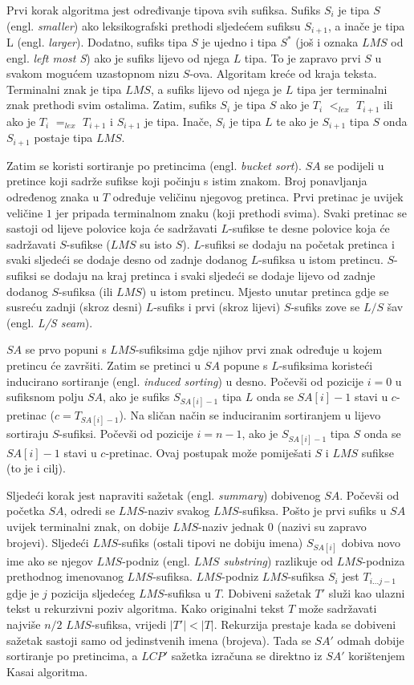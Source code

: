 \documentclass[times, utf8, proizvoljni, numeric]{fer}
\begin{document}
Prvi korak algoritma jest određivanje tipova svih sufiksa. Sufiks $S_{i}$ je tipa $S$ (engl. \textit{smaller}) ako leksikografski prethodi sljedećem sufiksu $S_{i+1}$, a inače je tipa L (engl. \textit{larger}). Dodatno, sufiks tipa $S$ je ujedno i tipa $S^*$ (još i oznaka $LMS$ od engl. \textit{left most S}) ako je sufiks lijevo od njega $L$ tipa. To je zapravo prvi $S$ u svakom mogućem uzastopnom nizu $S$-ova. Algoritam kreće od kraja teksta. Terminalni znak je tipa $LMS$, a sufiks lijevo od njega je $L$ tipa jer terminalni znak prethodi svim ostalima. Zatim, sufiks $S_{i}$ je tipa $S$ ako je $T_{i}$ $<_{lex}$ $T_{i+1}$ ili ako je $T_{i}$ $=_{lex}$ $T_{i+1}$ i $S_{i+1}$ je tipa. Inače, $S_{i}$ je tipa $L$ te ako je $S_{i+1}$ tipa $S$ onda $S_{i+1}$ postaje tipa $LMS$.

Zatim se koristi sortiranje po pretincima (engl. \textit{bucket sort}). $SA$ se podijeli u pretince koji sadrže sufikse koji počinju s istim znakom. Broj ponavljanja određenog znaka u $T$ određuje veličinu njegovog pretinca. Prvi pretinac je uvijek veličine $1$ jer pripada terminalnom znaku (koji prethodi svima). Svaki pretinac se sastoji od lijeve polovice koja će sadržavati $L$-sufikse te desne polovice koja će sadržavati $S$-sufikse ($LMS$ su isto $S$). $L$-sufiksi se dodaju na početak pretinca i svaki sljedeći se dodaje desno od zadnje dodanog $L$-sufiksa u istom pretincu. $S$-sufiksi se dodaju na kraj pretinca i svaki sljedeći se dodaje lijevo od zadnje dodanog $S$-sufiksa (ili $LMS$) u istom pretincu. Mjesto unutar pretinca gdje se susreću zadnji (skroz desni) $L$-sufiks i prvi (skroz lijevi) $S$-sufiks zove se $L/S$ šav (engl. \textit{L/S seam}).

$SA$ se prvo popuni s $LMS$-sufiksima gdje njihov prvi znak određuje u kojem pretincu će završiti. Zatim se pretinci u $SA$ popune s $L$-sufiksima koristeći inducirano sortiranje (engl. \textit{induced sorting}) u desno. Počevši od pozicije $i=0$ u sufiksnom polju $SA$, ako je sufiks $S_{SA[i]-1}$ tipa $L$ onda se $SA[i]-1$ stavi u $c$-pretinac ($c=T_{SA[i]-1}$). Na sličan način se induciranim sortiranjem u lijevo sortiraju $S$-sufiksi. Počevši od pozicije $i=n-1$, ako je $S_{SA[i]-1}$ tipa $S$ onda se $SA[i]-1$ stavi u $c$-pretinac. Ovaj postupak može pomiješati $S$ i $LMS$ sufikse (to je i cilj).

Sljedeći korak jest napraviti sažetak (engl. \textit{summary}) dobivenog $SA$. Počevši od početka $SA$, odredi se $LMS$-naziv svakog $LMS$-sufiksa. Pošto je prvi sufiks u $SA$ uvijek terminalni znak, on dobije $LMS$-naziv jednak $0$ (nazivi su zapravo brojevi). Sljedeći $LMS$-sufiks (ostali tipovi ne dobiju imena) $S_{SA[i]}$ dobiva novo ime ako se njegov $LMS$-podniz (engl. \textit{$LMS$ substring}) razlikuje od $LMS$-podniza prethodnog imenovanog $LMS$-sufiksa. $LMS$-podniz $LMS$-sufiksa $S_{i}$ jest $T_{i...j-1}$ gdje je $j$ pozicija sljedećeg $LMS$-sufiksa u $T$. Dobiveni sažetak $T'$ služi kao ulazni tekst u rekurzivni poziv algoritma. Kako originalni tekst $T$ može sadržavati najviše $n/2$ $LMS$-sufiksa, vrijedi $|T'|<|T|$. Rekurzija prestaje kada se dobiveni sažetak sastoji samo od jedinstvenih imena (brojeva). Tada se $SA'$ odmah dobije sortiranje po pretincima, a $LCP'$ sažetka izračuna se direktno iz $SA'$ korištenjem Kasai algoritma.
\end{document}
